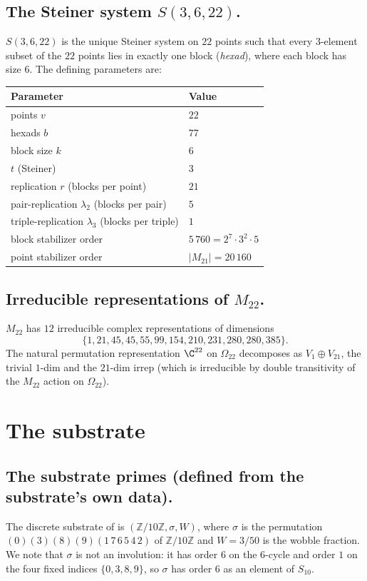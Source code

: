 \documentclass[11pt,reqno]{amsart}
\theoremstyle{plain}
\theoremstyle{definition}
\theoremstyle{remark}
\newcommand{\Z}{\mathbb{Z}}
\newcommand{\Mtwentytwo}{M_{22}}
\newcommand{\sig}{\sigma}
\begin{document}
\subsection{The Steiner system $S(3, 6, 22)$.}
$S(3, 6, 22)$ is the unique Steiner system on $22$ points such that
every $3$-element subset of the $22$ points lies in exactly one block
(\emph{hexad}), where each block has size $6$. The defining parameters
are:
\begin{center}
\begin{tabular}{ll}
\toprule
Parameter & Value \\
\midrule
points $v$ & $22$ \\
hexads $b$ & $77$ \\
block size $k$ & $6$ \\
$t$ (Steiner) & $3$ \\
replication $r$ (blocks per point) & $21$ \\
pair-replication $\lambda_{2}$ (blocks per pair) & $5$ \\
triple-replication $\lambda_{3}$ (blocks per triple) & $1$ \\
block stabilizer order & $5\,760 = 2^{7} \cdot 3^{2} \cdot 5$ \\
point stabilizer order & $|M_{21}| = 20\,160$ \\
\bottomrule
\end{tabular}
\end{center}

\subsection{Irreducible representations of $\Mtwentytwo$.}
$\Mtwentytwo$ has $12$ irreducible complex representations of
dimensions
\[
  \{1, 21, 45, 45, 55, 99, 154, 210, 231, 280, 280, 385\}.
\]
The natural permutation representation $\C^{22}$ on $\Omega_{22}$
decomposes as $V_{1} \oplus V_{21}$, the trivial $1$-dim and the
$21$-dim irrep (which is irreducible by double transitivity of the
$\Mtwentytwo$ action on $\Omega_{22}$).

\section{The substrate}
\label{sec:substrate}

\subsection{The substrate primes (defined from the substrate's own data).}
The discrete substrate of \cite{SandersGishFourCore} is
$(\Z/10\Z, \sig, W)$, where $\sig$ is the permutation
$(0)(3)(8)(9)(1\,7\,6\,5\,4\,2)$ of $\Z/10\Z$ and $W = 3/50$ is the
wobble fraction. We note that $\sig$ is not an involution: it has
order $6$ on the $6$-cycle and order $1$ on the four fixed indices
$\{0, 3, 8, 9\}$, so $\sig$ has order $6$ as an element of $S_{10}$.
\end{document}

